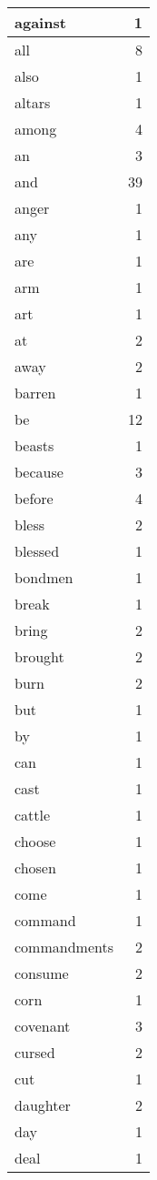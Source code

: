 \begin{center}
\begin{longtable}{l|r}
against & 1 \\ \hline
all & 8 \\ \hline
also & 1 \\ \hline
altars & 1 \\ \hline
among & 4 \\ \hline
an & 3 \\ \hline
and & 39 \\ \hline
anger & 1 \\ \hline
any & 1 \\ \hline
are & 1 \\ \hline
arm & 1 \\ \hline
art & 1 \\ \hline
at & 2 \\ \hline
away & 2 \\ \hline
barren & 1 \\ \hline
be & 12 \\ \hline
beasts & 1 \\ \hline
because & 3 \\ \hline
before & 4 \\ \hline
bless & 2 \\ \hline
blessed & 1 \\ \hline
bondmen & 1 \\ \hline
break & 1 \\ \hline
bring & 2 \\ \hline
brought & 2 \\ \hline
burn & 2 \\ \hline
but & 1 \\ \hline
by & 1 \\ \hline
can & 1 \\ \hline
cast & 1 \\ \hline
cattle & 1 \\ \hline
choose & 1 \\ \hline
chosen & 1 \\ \hline
come & 1 \\ \hline
command & 1 \\ \hline
commandments & 2 \\ \hline
consume & 2 \\ \hline
corn & 1 \\ \hline
covenant & 3 \\ \hline
cursed & 2 \\ \hline
cut & 1 \\ \hline
daughter & 2 \\ \hline
day & 1 \\ \hline
deal & 1 \\ \hline

\end{longtable}
\end{center}
